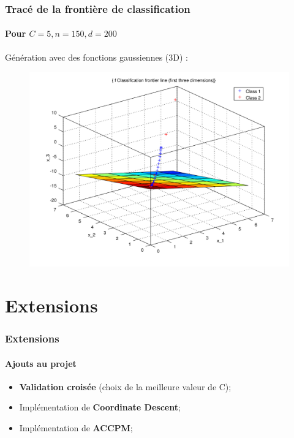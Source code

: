 \documentclass{beamer}
\begin{document}
\begin{frame}
\frametitle{Tracé de la frontière de classification}
\framesubtitle{Pour $C = 5, n = 150, d = 200$}

Génération avec des fonctions gaussiennes (3D) :

         \begin{figure}
         \centering
         \includegraphics[scale=0.4]{images/plane5.png}
         \end{figure}

\end{frame}

\section{Extensions}

\begin{frame}
\tableofcontents[currentsection]
\end{frame}

\begin{frame}
\frametitle{Extensions}
\framesubtitle{Ajouts au projet}

\begin{itemize}
\item \textbf{Validation croisée} (choix de la meilleure valeur de C);


\pause

\item Implémentation de \textbf{Coordinate Descent};


\pause

\item Implémentation de \textbf{ACCPM};

\end{itemize}

\end{frame}
\end{document}
